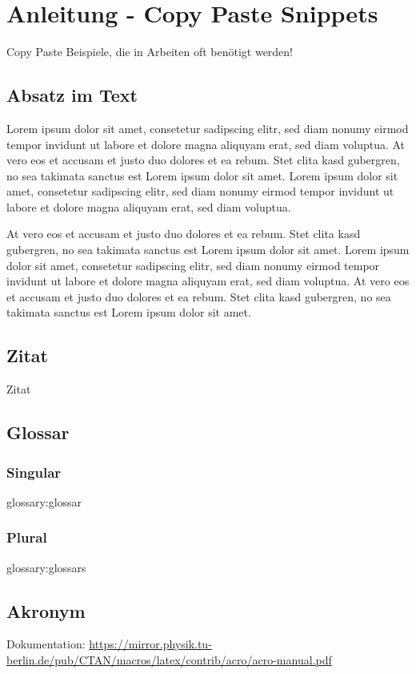 
\chapter{Anleitung - Copy Paste Snippets}

Copy Paste Beispiele, die in Arbeiten oft benötigt werden!


\section{Absatz im Text}
Lorem ipsum dolor sit amet, consetetur sadipscing elitr, sed diam nonumy eirmod tempor invidunt ut labore et dolore magna aliquyam erat, sed diam voluptua. At vero eos et accusam et justo duo dolores et ea rebum. Stet clita kasd gubergren, no sea takimata sanctus est Lorem ipsum dolor sit amet. Lorem ipsum dolor sit amet, consetetur sadipscing elitr, sed diam nonumy eirmod tempor invidunt ut labore et dolore magna aliquyam erat, sed diam voluptua.
\newline

At vero eos et accusam et justo duo dolores et ea rebum. Stet clita kasd gubergren, no sea takimata sanctus est Lorem ipsum dolor sit amet. Lorem ipsum dolor sit amet, consetetur sadipscing elitr, sed diam nonumy eirmod tempor invidunt ut labore et dolore magna aliquyam erat, sed diam voluptua. At vero eos et accusam et justo duo dolores et ea rebum. Stet clita kasd gubergren, no sea takimata sanctus est Lorem ipsum dolor sit amet.

\section{Zitat}
Zitat \cite{beispiel}

\section{Glossar}
\subsection{Singular}
\Gls{glossary:glossar}
\subsection{Plural}
\Glspl{glossary:glossar}

\section{Akronym}
Dokumentation: \url{https://mirror.physik.tu-berlin.de/pub/CTAN/macros/latex/contrib/acro/acro-manual.pdf} 
